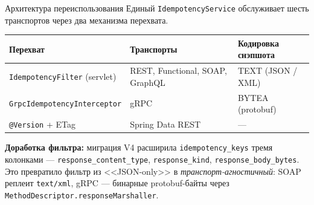 \documentclass[aspectratio=169]{beamer}
\begin{document}
\begin{frame}{Архитектура переиспользования}
\scriptsize
Единый \texttt{IdempotencyService} обслуживает шесть транспортов через два механизма перехвата.

\vspace{2mm}
\begin{center}
\begin{tabular}{@{}lll@{}}
\toprule
\textbf{Перехват} & \textbf{Транспорты} & \textbf{Кодировка снэпшота} \\
\midrule
\texttt{IdempotencyFilter} (servlet) & REST, Functional, SOAP, GraphQL & TEXT (JSON / XML) \\
\texttt{GrpcIdempotencyInterceptor}   & gRPC                            & BYTEA (protobuf) \\
\texttt{@Version} + ETag              & Spring Data REST                & --- \\
\bottomrule
\end{tabular}
\end{center}

\vspace{3mm}
\textbf{Доработка фильтра:} миграция V4 расширила \texttt{idempotency\_keys} тремя колонками --- \texttt{response\_content\_type}, \texttt{response\_kind}, \texttt{response\_body\_bytes}. Это превратило фильтр из <<JSON-only>> в \emph{транспорт-агностичный}: SOAP реплеит \texttt{text/xml}, gRPC --- бинарные protobuf-байты через \texttt{MethodDescriptor.responseMarshaller}.
\end{frame}

\end{document}
